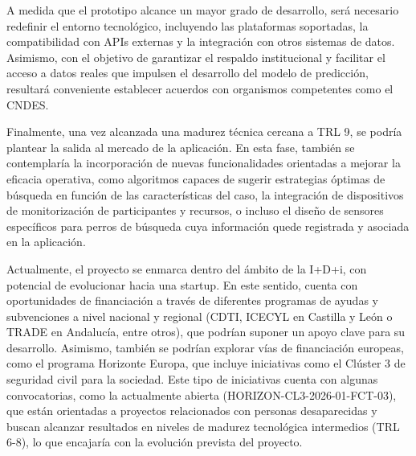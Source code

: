 A medida que el prototipo alcance un mayor grado de desarrollo, será necesario redefinir el entorno tecnológico, incluyendo las plataformas soportadas, la compatibilidad con APIs externas y la integración con otros sistemas de datos. Asimismo, con el objetivo de garantizar el respaldo institucional y facilitar el acceso a datos reales que impulsen el desarrollo del modelo de predicción, resultará conveniente establecer acuerdos con organismos competentes como el CNDES.

Finalmente, una vez alcanzada una madurez técnica cercana a TRL 9, se podría plantear la salida al mercado de la aplicación. En esta fase, también se contemplaría la incorporación de nuevas funcionalidades orientadas a mejorar la eficacia operativa, como algoritmos capaces de sugerir estrategias óptimas de búsqueda en función de las características del caso, la integración de dispositivos de monitorización de participantes y recursos, o incluso el diseño de sensores específicos para perros de búsqueda cuya información quede registrada y asociada en la aplicación.

Actualmente, el proyecto se enmarca dentro del ámbito de la I+D+i, con potencial de evolucionar hacia una startup. En este sentido, cuenta con oportunidades de financiación a través de diferentes programas de ayudas y subvenciones a nivel nacional y regional (CDTI, ICECYL en Castilla y León o TRADE en Andalucía, entre otros)\cite{icecyl_ayudas, junta_andalucia_trade_idi, cdti_apoyo_idi}, que podrían suponer un apoyo clave para su desarrollo. Asimismo, también se podrían explorar vías de financiación europeas, como el programa Horizonte Europa, que incluye iniciativas como el Clúster 3 de seguridad civil para la sociedad. Este tipo de iniciativas cuenta con algunas convocatorias, como la actualmente abierta (HORIZON-CL3-2026-01-FCT-03)\cite{horizon2026_fct03}, que están orientadas a proyectos relacionados con personas desaparecidas y buscan alcanzar resultados en niveles de madurez tecnológica intermedios (TRL 6-8), lo que encajaría con la evolución prevista del proyecto.